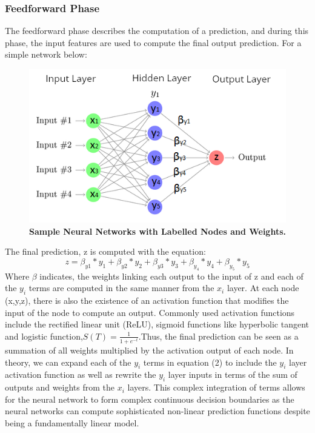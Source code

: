 \documentclass{article}
\begin{document}
\subsubsection{Feedforward Phase}
The feedforward phase describes the computation of a prediction, and during this phase, the input features are used to compute the final output prediction. For a simple network below:
\begin{figure}[H]
\includegraphics{neuralnetworksample.png}
\caption{\textbf{Sample Neural Networks with Labelled Nodes and Weights.}}
\centering
\end{figure}
The final prediction, z is computed with the equation:
\begin{equation}
z = \beta_{y1} * y_1 + \beta_{y2} * y_2 + \beta_{y3} * y_3 + \beta_{y_4} * y_4 + \beta_{y_5} * y_5
\end{equation}
Where $\beta$ indicates, the weights linking each output to the input of z and each of the $y_i$ terms are computed in the same manner from the $x_i$ layer. At each node (x,y,z), there is also the existence of an activation function that modifies the input of the node to compute an output. Commonly used activation functions include the rectified linear unit (ReLU), sigmoid functions like hyperbolic tangent and logistic function,$ S(T)=\frac{1}{1+e^{-t}}$.Thus, the final prediction can be seen as a summation of all weights multiplied by the activation output of each node. In theory, we can expand each of the $y_i$ terms in equation (2) to include the $y_i$ layer activation function as well as rewrite the $y_i$ layer inputs in terms of the sum of outputs and weights from the $x_i$ layers. This complex integration of terms allows for the neural network to form complex continuous decision boundaries as the neural networks can compute sophisticated non-linear prediction functions despite being a fundamentally linear model.
\end{document}
